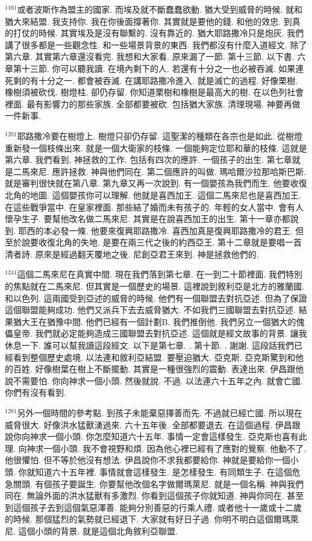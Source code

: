 \documentclass{book}
\begin{document}
$^{1161}$或者波斯作為盟主的國家.
而埃及就不斷蠢蠢欲動.
猶大受到威脅的時候.
就和猶大來結盟.
我支持你.
我在你後面撐著你.
其實就是要他的錢.
和他的效忠.
到真的打仗的時候.
其實埃及是沒有聯繫的.
沒有靠近的.
猶大耶路撒冷只是炮灰.
我們講了很多都是一些觀念性.
和一些場景背景的東西.
我們都沒有什麼入道經文.
除了第六章.
其實第六章還沒看完.
我想和大家看.
原來漏了一節.
第十三節.
以下書.
六章第十三節.
你可以聽我讀.
在境內剩下的人.
若還有十分之一也必被吞滅.
如果連死剩的有十分之一.
都會被吞滅.
在講耶路撒冷進入.
就是滅亡的過程.
好像栗樹.
橡樹須被砍伐.
樹燈柱.
卻仍存留.
你知道栗樹和橡樹是最高大的樹.
在以色列社會裡面.
最有影響力的那些家族.
全部都要被砍.
包括猶大家族.
清理現場.
神要再做一件新事.

$^{1201}$耶路撒冷要在樹燈上.
樹燈只卻仍存留.
這聖潔的種類在各宗也是如此.
從樹燈重新發一個枝條出來.
就是一個大衛家的枝條.
一個能夠定位耶和華的枝條.
這就是第六章.
我們看到.
神拯救的工作.
包括有四次的應許.
一個孩子的出生.
第七章就是二馬來尼.
應許拯救.
神與他們同在.
第二個應許的叫做.
瑪哈爾沙拉那哈斯巴斯.
就是審判很快就在第八章.
第九章又再一次說到.
有一個嬰孩為我們而生.
他要收復北角的地圖.
這個嬰孩你可以理解.
他就是喜西加王.
這個二馬來尼也是喜西加王.
在這些戰爭當中.
在皇家裡面.
那些結了婚而未有孩子的.
年輕的女人當中.
會有人懷孕生子.
要幫他改名做二馬來尼.
其實是在說喜西加王的出生.
第十一章亦都說到.
耶西的本必發一條.
他要來復興耶路撒冷.
喜西加真是復興耶路撒冷的君王.
但至於說要收復北角的失地.
是要在兩三代之後的約西亞王.
第十二章就是要唱一首清者詩.
原來是經過翻天覆地之後.
尼創亞君王來到.
神是拯救他們的.

$^{1241}$這個二馬來尼在真實中間.
現在我們落到第七章.
在一到二十節裡面.
我們特別的焦點就在二馬來尼.
但其實是一個歷史的場景.
這裡說到敘利亞是北方的雅蘭國.
和以色列.
這兩國受到亞述的威脅的時候.
他們有一個聯盟去對抗亞述.
但為了保證這個聯盟能夠成功.
他們又派兵下去去威脅猶大.
不如我們三國聯盟去對抗亞述.
結果猶大王在猶豫中間.
他們已經有一個計劃B.
我們推倒他.
我們另立一個猶大的傀儡皇帝.
我們就必定能夠造成三國聯盟去對抗亞述.
這個就是經文故事的背景.
讓我休息一下.
誰可以幫我讀這段經文.
以下是第七章.
.
第十節.
.
謝謝.
這段話我們已經看到整個歷史處境.
以法連和敘利亞結盟.
要壓迫猶大.
亞克斯.
亞克斯驚到和他的百姓.
好像樹葉在樹上不斷擺動.
其實是一種很強烈的震動.
表達出來.
伊昌跟他說不需要怕.
你向神求一個小頭.
然後就說.
不過.
以法連六十五年之內.
就會亡國.
你們有沒有看到.

$^{1281}$另外一個時間的參考點.
到孩子未能棄惡擇善而先.
不過就已經亡國.
所以現在威脅很大.
好像洪水猛獸湧過來.
六十五年後.
全部都要退去.
在這個過程.
伊昌跟說你向神求一個小頭.
你怎麼知道六十五年.
事情一定會這樣發生.
亞克斯也喜有此理.
向神求一個小頭.
我不會視野和煩.
因為他心裡已經有了應對的覺察.
他動不了.
他很懼怕.
但不等於他沒有想法.
伊昌說你不求我都要給你.
神就是要給你一個小頭.
你就知道六十五年裡.
事情就會這樣發生.
是怎樣發生.
有同類生子.
在這個危急關頭.
有個孩子要誕生.
你要幫他改個名字做爾瑪萊尼.
就是一個名稱.
神與我們同在.
無論外面的洪水猛獸有多激烈.
你看到這個孩子你就知道.
神與你同在.
甚至到這個孩子去到這個氣惡澤善.
能夠分別善惡的行乘人禮.
或者他十一歲或十二歲的時候.
那個猛烈的氣勢就已經退下.
大家就有好日子過.
你明不明白這個爾瑪萊尼.
這個小頭的背景.
就是這個北角敘利亞聯盟.
\end{document}
